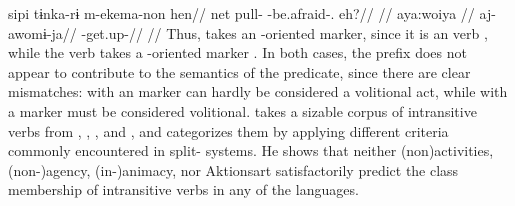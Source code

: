  \kalina
{}
\begingl
\gla sipi tɨnka-rɨ m-ekema-non hen//
\glb net pull- -be.afraid-. eh?//
\glft {} \parencite[][253]{courtz2008carib}//
\endgl
{}
\begingl
\glpreamble aya:woiya //
\gla aj-awomɨ-ja//
\glb {}-get.up-//
\glft {} \parencite[][167]{hoff1968carib}//
\endgl
\xe
%
Thus,   takes an -oriented marker, since it is an  verb , while the  verb   takes a -oriented marker .
In both cases, the prefix does not appear to contribute to the semantics of the predicate, since there are clear mismatches:
 with an  marker can hardly be considered a volitional act, while   with a  marker must be considered volitional.
\textcite{meira2000split} takes a sizable corpus of intransitive verbs from \trio, \kalina, \apalai, and \wayana, and categorizes them by applying different criteria commonly encountered in split- systems.
He shows that neither (non\-)activities, %
(non-)agency, %
(in-)animacy, %
nor Aktionsart %
satisfactorily predict the class membership of intransitive verbs in any of the languages.

